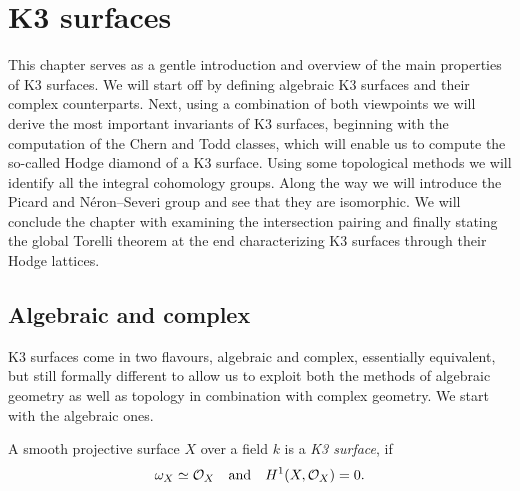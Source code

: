 \section{K3 surfaces}
\label{Chapter: K3}

This chapter serves as a gentle introduction and overview of the main properties of K3 surfaces. We will start off by defining algebraic K3 surfaces and their complex counterparts. Next, using a combination of both viewpoints we will derive the most important invariants of K3 surfaces, beginning with the computation of the Chern and Todd classes, which will enable us to compute the so-called Hodge diamond of a K3 surface. Using some topological methods we will identify all the integral cohomology groups. Along the way we will introduce the Picard and Néron--Severi group and see that they are isomorphic. We will conclude the chapter with examining the intersection pairing and finally stating the global Torelli theorem at the end characterizing K3 surfaces through their Hodge lattices. 


\subsection{Algebraic and complex}

K3 surfaces come in two flavours, algebraic and complex, essentially equivalent, but still formally different to allow us to exploit both the methods of algebraic geometry as well as topology in combination with complex geometry. We start with the algebraic ones.

\begin{definition}
    A smooth projective surface $X$ over a field $k$ is a \emph{K3 surface}, if 
    \[
        \omega_X \simeq {\mathcal{O}_{X}} \quad \text{and} \quad H^{1}(X, {\mathcal{O}_{X}}) = 0.
    \]
\end{definition}

